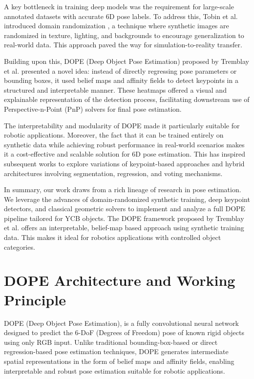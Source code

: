 \documentclass[conference]{IEEEtran}
\begin{document}
A key bottleneck in training deep models was the requirement for large-scale annotated datasets with accurate 6D pose labels. To address this, Tobin et al. introduced domain randomization \cite{tobin2017domain}, a technique where synthetic images are randomized in texture, lighting, and backgrounds to encourage generalization to real-world data. This approach paved the way for simulation-to-reality transfer.

Building upon this, DOPE (Deep Object Pose Estimation) proposed by Tremblay et al. \cite{tremblay2018dope} presented a novel idea: instead of directly regressing pose parameters or bounding boxes, it used belief maps and affinity fields to detect keypoints in a structured and interpretable manner. These heatmaps offered a visual and explainable representation of the detection process, facilitating downstream use of Perspective-n-Point (PnP) solvers for final pose estimation.

The interpretability and modularity of DOPE made it particularly suitable for robotic applications. Moreover, the fact that it can be trained entirely on synthetic data while achieving robust performance in real-world scenarios makes it a cost-effective and scalable solution for 6D pose estimation. This has inspired subsequent works to explore variations of keypoint-based approaches and hybrid architectures involving segmentation, regression, and voting mechanisms.

In summary, our work draws from a rich lineage of research in pose estimation. We leverage the advances of domain-randomized synthetic training, deep keypoint detectors, and classical geometric solvers to implement and analyze a full DOPE pipeline tailored for YCB objects.
The DOPE framework proposed by Tremblay et al. \cite{tremblay2018dope} offers an interpretable, belief-map based approach using synthetic training data. This makes it ideal for robotics applications with controlled object categories.

\section{DOPE Architecture and Working Principle}

DOPE (Deep Object Pose Estimation), is a fully convolutional neural network designed to predict the 6-DoF (Degrees of Freedom) pose of known rigid objects using only RGB input. Unlike traditional bounding-box-based or direct regression-based pose estimation techniques, DOPE generates intermediate spatial representations in the form of belief maps and affinity fields, enabling interpretable and robust pose estimation suitable for robotic applications.
\end{document}
